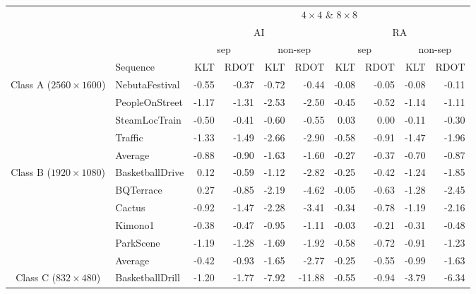 \documentclass[11pt,a4paper,openright,twoside]{book}
\numberwithin{equation}{section} %
\numberwithin{figure}{section} %
\numberwithin{table}{section} %
\begin{document}
\begin{table}[tb]
	\centering
	\small
	\begin{tabularx}{\textwidth}{c|X|rr|rr|rr|rr}
		\multicolumn{2}{c}{} &
		\multicolumn{8}{c}{$4\times4$ \& $8\times8$} \\
		\cline{3-10}
		\multicolumn{2}{c}{} &
		\multicolumn{4}{c|}{AI} &
		\multicolumn{4}{c}{RA} \\
		\cline{3-10}
		\multicolumn{2}{c}{} &
		\multicolumn{2}{c|}{sep} &
		\multicolumn{2}{c|}{non-sep} &
		\multicolumn{2}{c|}{sep} &
		\multicolumn{2}{c}{non-sep} \\
		\cline{2-10}
		\multicolumn{1}{c}{} & {Sequence} &
		{KLT} & {RDOT} & {KLT} & {RDOT} &
		{KLT} & {RDOT} & {KLT} & {RDOT} \\
		\hline\hline
		\multirow{5}{0.10\textwidth}{\centering Class A \scriptsize($2560\times1600$)}
		& NebutaFestival       & -0.55 & -0.37 & -0.72 &  -0.44 & -0.08 & -0.05 & -0.08 & -0.11 \\
		& PeopleOnStreet       & -1.17 & -1.31 & -2.53 &  -2.50 & -0.45 & -0.52 & -1.14 & -1.11 \\
		& SteamLocTrain        & -0.50 & -0.41 & -0.60 &  -0.55 &  0.03 &  0.00 & -0.11 & -0.30 \\
		& Traffic              & -1.33 & -1.49 & -2.66 &  -2.90 & -0.58 & -0.91 & -1.47 & -1.96 \\
		\cline{2-10}
		& Average              & -0.88 & -0.90 & -1.63 &  -1.60 & -0.27 & -0.37 & -0.70 & -0.87 \\
		\hline\hline
		\multirow{6}{0.10\textwidth}{\centering Class B \scriptsize($1920\times1080$)}
		& BasketballDrive      &  0.12 & -0.59 & -1.12 &  -2.82 & -0.25 & -0.42 & -1.24 & -1.85 \\
		& BQTerrace            &  0.27 & -0.85 & -2.19 &  -4.62 & -0.05 & -0.63 & -1.28 & -2.45 \\
		& Cactus               & -0.92 & -1.47 & -2.28 &  -3.41 & -0.34 & -0.78 & -1.19 & -2.16 \\
		& Kimono1              & -0.38 & -0.47 & -0.95 &  -1.11 & -0.03 & -0.21 & -0.31 & -0.48 \\
		& ParkScene            & -1.19 & -1.28 & -1.69 &  -1.92 & -0.58 & -0.72 & -0.91 & -1.23 \\
		\cline{2-10}
		& Average              & -0.42 & -0.93 & -1.65 &  -2.77 & -0.25 & -0.55 & -0.99 & -1.63 \\
		\hline\hline
		\multirow{5}{0.10\textwidth}{\centering Class C \scriptsize($832\times480$)}
		& BasketballDrill      & -1.20 & -1.77 & -7.92 & -11.88 & -0.55 & -0.94 & -3.79 & -6.34 \\

\end{tabularx}
\end{table}
\end{document}
